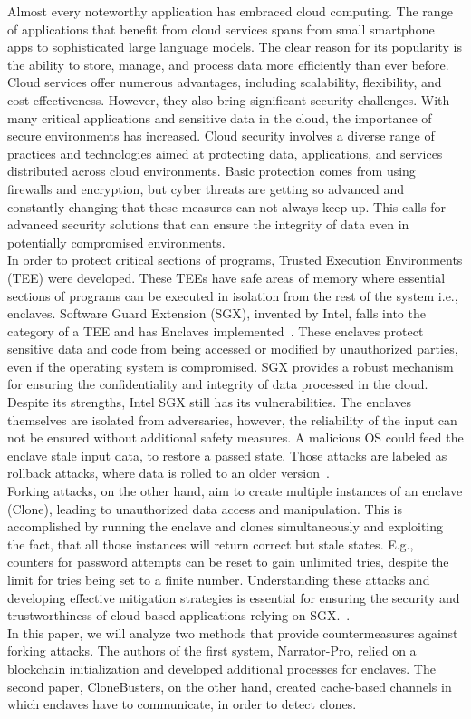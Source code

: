 
Almost every noteworthy application has embraced cloud computing. The range of applications that benefit from cloud services spans from small smartphone apps to sophisticated large language models. The clear reason for its popularity is the ability to store, manage, and process data more efficiently than ever before. Cloud services offer numerous advantages, including scalability, flexibility, and cost-effectiveness. However, they also bring significant security challenges. With many critical applications and sensitive data in the cloud, the importance of secure environments has increased. Cloud security involves a diverse range of practices and technologies aimed at protecting data, applications, and services distributed across cloud environments. Basic protection comes from using firewalls and encryption, but cyber threats are getting so advanced and constantly changing that these measures can not always keep up. This calls for advanced security solutions that can ensure the integrity of data even in potentially compromised environments.\\

In order to protect critical sections of programs, Trusted Execution Environments (TEE) were developed. These TEEs have safe areas of memory where essential sections of programs can be executed in isolation from the rest of the system i.e., enclaves. Software Guard Extension (SGX), invented by Intel, falls into the category of a TEE and has Enclaves implemented~\cite{SGX}. These enclaves protect sensitive data and code from being accessed or modified by unauthorized parties, even if the operating system is compromised. SGX provides a robust mechanism for ensuring the confidentiality and integrity of data processed in the cloud. Despite its strengths, Intel SGX still has its vulnerabilities. The enclaves themselves are isolated from adversaries, however, the reliability of the input can not be ensured without additional safety measures. A malicious OS could feed the enclave stale input data, to restore a passed state. Those attacks are labeled as rollback attacks, where data is rolled to an older version~\cite{esccc}. \\
Forking attacks, on the other hand, aim to create multiple instances of an enclave (Clone), leading to unauthorized data access and manipulation. This is accomplished by running the enclave and clones simultaneously and exploiting the fact, that all those instances will return correct but stale states. E.g., counters for password attempts can be reset to gain unlimited tries, despite the limit for tries being set to a finite number. Understanding these attacks and developing effective mitigation strategies is essential for ensuring the security and trustworthiness of cloud-based applications relying on SGX.~\cite{nfw}.\\
In this paper, we will analyze two methods that provide countermeasures against forking attacks. The authors of the first system, Narrator-Pro, relied on a blockchain initialization and developed additional processes for enclaves. The second paper, CloneBusters, on the other hand, created cache-based channels in which enclaves have to communicate, in order to detect clones.
